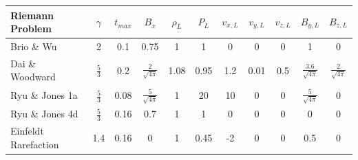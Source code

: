 \documentclass[modern, linenumbers]{aastex631}
\begin{document}
\begin{table}
    \centering
    \begin{tabular}{lcccccccccc}
    
    
    
    
    
        Riemann Problem & $\gamma$ & $t_{max}$ & $B_x$ & $\rho_L$ & $P_L$ & $v_{x,L}$ & $v_{y,L}$ & $v_{z,L}$ & $B_{y,L}$ & $B_{z,L}$  \\ \hline
    
        Brio \& Wu           & 2             & 0.1  & 0.75                    & 1    & 1    & 0    & 0    & 0   & 1                         & 0                       \\ \hline
        Dai \& Woodward      & $\frac{5}{3}$ & 0.2  & $\frac{2}{\sqrt{4\pi}}$ & 1.08 & 0.95 & 1.2  & 0.01 & 0.5 & $\frac{3.6}{\sqrt{4\pi}}$ & $\frac{2}{\sqrt{4\pi}}$ \\ \hline
        Ryu \& Jones 1a      & $\frac{5}{3}$ & 0.08 & $\frac{5}{\sqrt{4\pi}}$ & 1    & 20   & 10   & 0    & 0   & $\frac{5}{\sqrt{4\pi}}$   & 0                       \\ \hline
        Ryu \& Jones 4d      & $\frac{5}{3}$ & 0.16 & 0.7                     & 1    & 1    & 0    & 0    & 0   & 0                         & 0                       \\ \hline
        Einfeldt Rarefaction & 1.4           & 0.16 & 0                       & 1    & 0.45 & -2   & 0    & 0   & 0.5                       & 0                       \\ \hline
    

\end{tabular}
\end{table}
\end{document}
